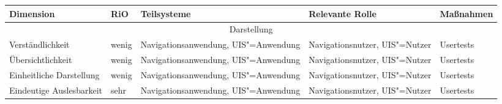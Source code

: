 \begin{landscape}
\begin{longtable}{|p{4.5cm}|p{1.5cm}|p{4.5cm}|p{4.5cm}|p{3.5cm}|}
   Dimension & RiO & Teilsysteme & Relevante Rolle & Maßnahmen\\ \hline   
   \multicolumn{5}{|c|}{Darstellung}  \\ \hline
   Verständlichkeit & wenig & Navigationsanwendung, UIS"=Anwendung & Navigationsnutzer, UIS"=Nutzer & Usertests \\ \hline 
   Übersichtlichkeit & wenig & Navigationsanwendung, UIS"=Anwendung & Navigationsnutzer, UIS"=Nutzer & Usertests \\ \hline
   Einheitliche Darstellung & wenig & Navigationsanwendung, UIS"=Anwendung & Navigationsnutzer, UIS"=Nutzer & Usertests \\ \hline
   Eindeutige Auslesbarkeit & sehr & Navigationsanwendung, UIS"=Anwendung & Navigationsnutzer, UIS"=Nutzer & Usertests \\ \hline
  \end{longtable}
\end{landscape}

